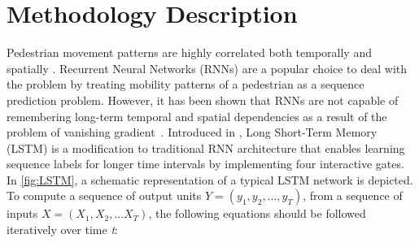 \section{Methodology Description}
\label{S:t4}
Pedestrian movement patterns are highly correlated both temporally and spatially \cite{song2016deeptransport}. Recurrent Neural Networks (RNNs) are a popular choice to deal with the problem by treating mobility patterns of a pedestrian as a sequence prediction problem. However, it has been shown that RNNs are not capable of remembering long-term temporal and spatial dependencies as a result of the problem of vanishing gradient~\cite{hochreiter1997long}. Introduced in \cite{hochreiter1997long}, Long Short-Term Memory (LSTM) is a modification to traditional RNN architecture that enables learning sequence labels for longer time intervals by implementing four interactive gates. In \cref{fig:LSTM}, a schematic representation of a typical LSTM network is depicted. To compute a sequence of output units \(Y=(y_1,y_2,...,y_T)\), from a sequence of inputs \(X=(X_1,X_2,...X_T)\), the following equations should be followed iteratively over time \textit{t}:

